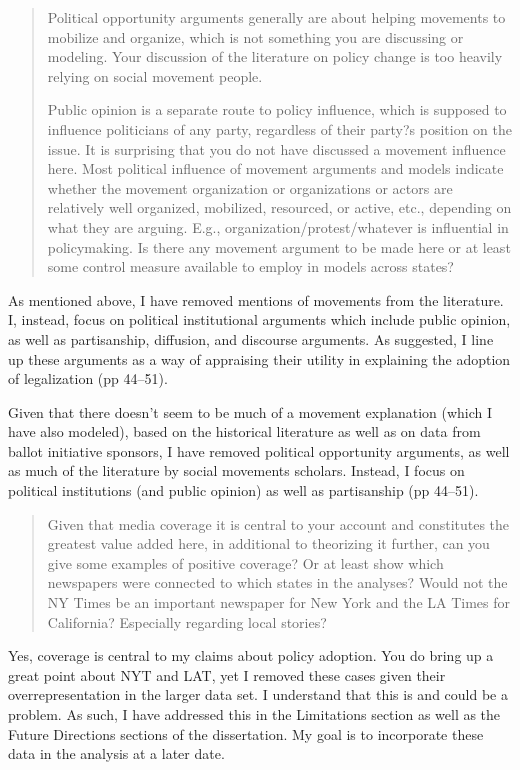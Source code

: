 \documentclass[12pt,stdletter,dateno,sigleft]{newlfm} %
\begin{document}
\begin{newlfm}
\begin{quotation}
{Political opportunity arguments generally are about helping movements to mobilize and organize, which is not something you are discussing or modeling.  Your discussion of the literature on policy change is too heavily relying on social movement people. 

Public opinion is a separate route to policy influence, which is supposed to influence politicians of any party, regardless of their party?s position on the issue.  It is surprising that you do not have discussed a movement influence here.  Most political influence of movement arguments and models indicate whether the movement organization or organizations or actors are relatively well organized, mobilized, resourced, or active, etc., depending on what they are arguing. E.g., organization/protest/whatever is influential in policymaking. Is there any movement argument to be made here or at least some control measure available to employ in models across states?  
}
\end{quotation}

As mentioned above, I have removed mentions of movements from the literature. I, instead, focus on political institutional arguments which include public opinion, as well as partisanship, diffusion, and discourse arguments. As suggested, I line up these arguments as a way of appraising their utility in explaining the adoption of legalization (pp 44--51). 


Given that there doesn't seem to be much of a movement explanation (which I have also modeled), based on the historical literature as well as on data from ballot initiative sponsors, I have removed political opportunity arguments, as well as much of the literature by social movements scholars. Instead, I focus on political institutions (and public opinion) as well as partisanship (pp 44--51). 


\begin{quotation}{\color{red}\noindent \footnotesize
Given that media coverage it is central to your account and constitutes the greatest value added here, in additional to theorizing it further, can you give some examples of positive coverage?  Or at least show which newspapers were connected to which states in the analyses?  Would not the NY Times be an important newspaper for New York and the LA Times for California?  Especially regarding local stories?  
}
\end{quotation}


Yes, coverage is central to my claims about policy adoption. You do bring up a great point about NYT and LAT, yet I removed these cases given their overrepresentation in the larger data set. I understand that this is and could be a problem. As such, I have addressed this in the Limitations section as well as the Future Directions sections of the dissertation. My goal is to incorporate these data in the analysis at a later date. 




\end{newlfm}
\end{document}
